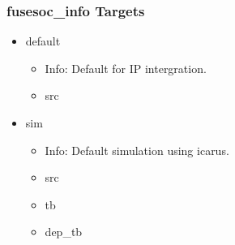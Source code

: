 \subsubsection{fusesoc\_info Targets}
\begin{itemize}
\item default
	\begin{itemize}
	\item[$\space$] Info: Default for IP intergration.
	\item src
	\end{itemize}
\item sim
	\begin{itemize}
	\item[$\space$] Info: Default simulation using icarus.
	\item src
	\item tb
	\item dep\_tb
	\end{itemize}
\end{itemize}
